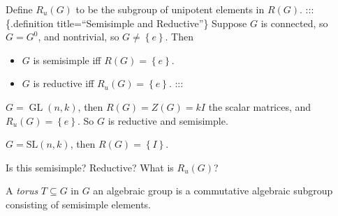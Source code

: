Define \(R_u(G)\) to be the subgroup of unipotent elements in \(R(G)\).
:::\{.definition title=``Semisimple and Reductive''\} \hfill Suppose
\(G\) is connected, so \(G = G^0\), and nontrivial, so
\(G\neq \left\{{e}\right\}\). Then

\begin{itemize}
\tightlist
\item
  \(G\) is semisimple iff \(R(G) = \left\{{e}\right\}\).
\item
  \(G\) is reductive iff \(R_u(G) = \left\{{e}\right\}\). :::
\end{itemize}

\begin{example}

\begin{example}

\(G = \operatorname{GL}(n, k)\), then \(R(G) = Z(G) = kI\) the scalar
matrices, and \(R_u(G) = \left\{{e}\right\}\). So \(G\) is reductive and
semisimple.

\end{example}

\end{example}

\begin{example}

\begin{example}

\(G = {\text{SL}}(n , k)\), then \(R(G) = \left\{{I}\right\}\).

\begin{exercise}

\begin{exercise}

Is this semisimple? Reductive? What is \(R_u(G)\)?

\end{exercise}

\end{exercise}

\end{example}

\end{example}

\begin{definition}[Torus]

\begin{definition}[Torus]

A \emph{torus} \(T\subseteq G\) in \(G\) an algebraic group is a
commutative algebraic subgroup consisting of semisimple elements.

\end{definition}

\end{definition}

